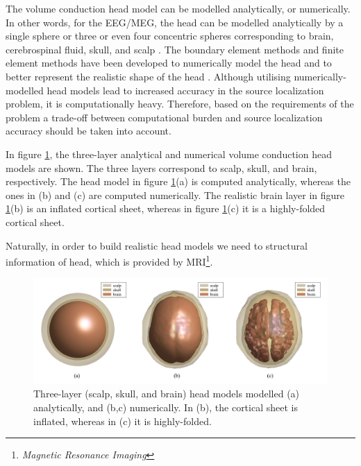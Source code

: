 The volume conduction head model can be modelled analytically, 
or numerically.
In other words, for the EEG/MEG, the head can be modelled analytically by a single sphere or three or even four concentric spheres corresponding to brain, cerebrospinal fluid, skull, and scalp \cite{Hosek1978}.
The boundary element methods and finite element methods have been developed to numerically model the head and to better represent the realistic shape of the head \cite{Yan1991,Akalin-Acar2004}.
Although utilising numerically-modelled head models lead to increased accuracy in the source localization problem, it is computationally heavy.
Therefore, based on the requirements of the problem a trade-off between computational burden and source localization accuracy should be taken into account.

In figure \ref{fig:HeadModel}, the three-layer analytical and numerical volume conduction head models are shown.
The three layers correspond to scalp, skull, and brain, respectively.
The head model in figure \ref{fig:HeadModel}(a) is computed analytically, whereas the ones in (b) and (c) are computed numerically.
The realistic brain layer in figure \ref{fig:HeadModel}(b) is an inflated cortical sheet, whereas in figure \ref{fig:HeadModel}(c) it is a highly-folded cortical sheet.

Naturally, in order to build realistic head models we need to structural information of head, which is provided by MRI\footnote{\emph{Magnetic Resonance Imaging}}.
\begin{figure}[!b]
\centering
\includegraphics[width=1\textwidth]{images/HeadModel.png} %
\caption{Three-layer (scalp, skull, and brain) head models modelled (a) analytically, and (b,c) numerically.
In (b), the cortical sheet is inflated, whereas in (c) it is highly-folded.}
\label{fig:HeadModel}
\end{figure}
\FloatBarrier
